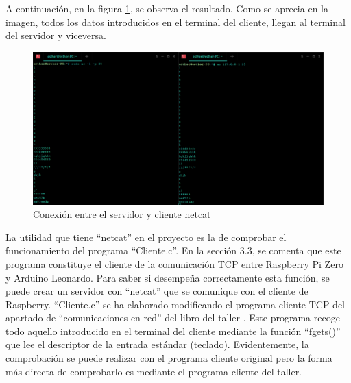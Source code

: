 A continuación, en la figura \ref{fig: netcat}, se observa el resultado. Como se aprecia en la imagen, todos los datos introducidos en el terminal del cliente, llegan al terminal del servidor y viceversa.

    \begin{figure}
    \centering
    \includegraphics[scale = 0.3]{anexo_b/figuras_dir/csnetcat.jpg}
    \caption{Conexión entre el servidor y cliente netcat}
    \label{fig: netcat}
    \end{figure}

La utilidad que tiene ``netcat'' en el proyecto es la de comprobar el funcionamiento del programa ``Cliente.c''. En la sección 3.3, se comenta que este programa constituye el cliente de la comunicación TCP entre Raspberry Pi Zero y Arduino Leonardo. Para saber si desempeña correctamente esta función, se puede crear un servidor con ``netcat'' que se comunique con el cliente de Raspberry. ``Cliente.c'' se ha elaborado modificando el programa cliente TCP del apartado de ``comunicaciones en red'' del libro del taller \citep[pág. 83--85]{tallerRPi}. Este programa recoge todo aquello introducido en el terminal del cliente mediante la función ``fgets()'' que lee el descriptor de la entrada estándar (teclado). Evidentemente, la comprobación se puede realizar con el programa cliente original pero la forma más directa de comprobarlo es mediante el programa cliente del taller.

